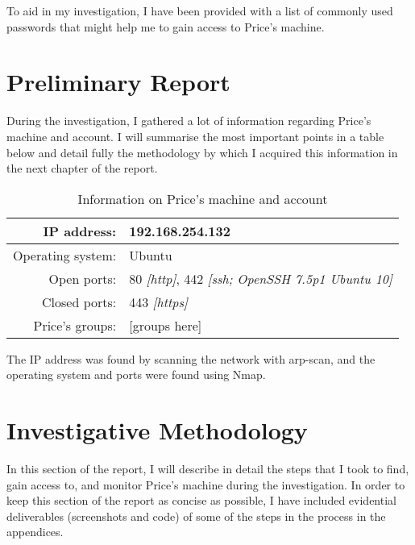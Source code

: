 \documentclass[12pt]{report}
\begin{document}
To aid in my investigation, I have been provided with a list of commonly used passwords that might help me to gain access to Price's machine.




\pagebreak
\chapter{Preliminary Report}
During the investigation, I gathered a lot of information regarding Price's machine and account. I will summarise the most important points in a table below and detail fully the methodology by which I acquired this information in the next chapter of the report.

\begin{table}[h!]
  \centering
  \begin{tabular}{|r l|}
    \hline
    IP address: & 192.168.254.132 \\
    \hline
    Operating system: & Ubuntu \\
    \hline
    Open ports: & 80 \textit{[http]}, 442 \textit{[ssh; OpenSSH 7.5p1 Ubuntu 10]} \\
    \hline
    Closed ports: & 443 \textit{[https]} \\
    \hline
    Price's groups: & [groups here] \\
    \hline
  \end{tabular}
  \caption{Information on Price's machine and account}
  \label{table:pricemachineinfo}
\end{table}

The IP address was found by scanning the network with arp-scan, and the operating system and ports were found using Nmap.


\pagebreak
\chapter{Investigative Methodology}
In this section of the report, I will describe in detail the steps that I took to find, gain access to, and monitor Price's machine during the investigation. In order to keep this section of the report as concise as possible, I have included evidential deliverables (screenshots and code) of some of the steps in the process in the appendices.
\end{document}
